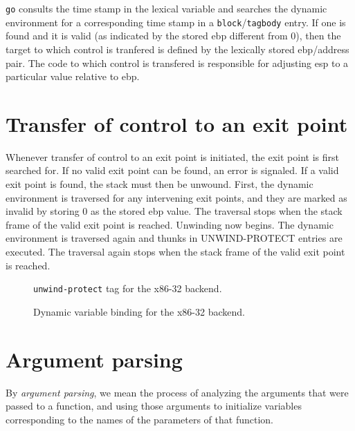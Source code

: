 \texttt{go} consults the time stamp in the lexical variable and
searches the dynamic environment for a corresponding time stamp in a
\texttt{block}/\texttt{tagbody} entry.  If one is found and it is
valid (as indicated by the stored ebp different from 0), then the
target to which control is tranfered is defined by the lexically
stored ebp/address pair.  The code to which control is transfered is
responsible for adjusting esp to a particular value relative to ebp.

\section{Transfer of control to an exit point}

Whenever transfer of control to an exit point is initiated, the exit
point is first searched for.  If no valid exit point can be found, an
error is signaled.  If a valid exit point is found, the stack must
then be unwound.  First, the dynamic environment is traversed for any
intervening exit points, and they are marked as invalid by storing 0
as the stored ebp value.  The traversal stops when the stack frame of
the valid exit point is reached.  Unwinding now begins.  The dynamic
environment is traversed again and thunks in UNWIND-PROTECT entries
are executed.  The traversal again stops when the stack frame of the
valid exit point is reached.

\begin{figure}
\begin{center}
\end{center}
\caption{\label{fig-x86-32-unwind-protect}
\texttt{unwind-protect} tag for the x86-32 backend.}
\end{figure}

\begin{figure}
\begin{center}
\end{center}
\caption{\label{fig-x86-32-dynamic-binding}
Dynamic variable binding for the x86-32 backend.}
\end{figure}

\section{Argument parsing}

By \emph{argument parsing}, we mean the process of analyzing the
arguments that were passed to a function, and using those arguments to
initialize variables corresponding to the names of the parameters of
that function.

